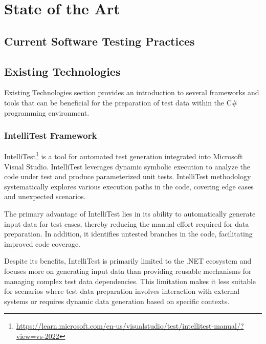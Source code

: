 
\chapter{State of the Art\label{chap:state_of_the_art}}

\todo{} \cite{Emmi2007Jul} \cite{Arcuri2020Jul}\cite{Emmi2007Jul}

\section{Current Software Testing Practices}
\todo{}

\section{Existing Technologies}
Existing Technologies section provides an introduction to several frameworks and tools that can be beneficial for the preparation of test data within the C\# programming environment.

\subsection{IntelliTest Framework}
IntelliTest\footnote{\href{https://learn.microsoft.com/en-us/visualstudio/test/intellitest-manual/?view=vs-2022}{https://learn.microsoft.com/en-us/visualstudio/test/intellitest-manual/?view=vs-2022}} is a tool for automated test generation integrated into Microsoft Visual Studio. IntelliTest leverages dynamic symbolic execution to analyze the code under test and produce parameterized unit tests. IntelliTest methodology systematically explores various execution paths in the code, covering edge cases and unexpected scenarios.

The primary advantage of IntelliTest lies in its ability to automatically generate input data for test cases, thereby reducing the manual effort required for data preparation. In addition, it identifies untested branches in the code, facilitating improved code coverage.

Despite its benefits, IntelliTest is primarily limited to the .NET ecosystem and focuses more on generating input data than providing reusable mechanisms for managing complex test data dependencies. This limitation makes it less suitable for scenarios where test data preparation involves interaction with external systems or requires dynamic data generation based on specific contexts.

